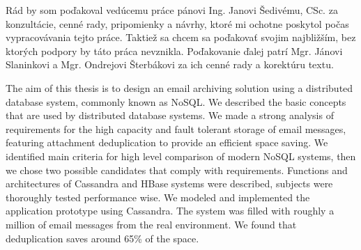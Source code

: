 \documentclass[11pt,twoside,a4paper]{book}
\begin{document}

\coverpagestarts


\acknowledgements
\noindent
Rád by som poďakoval vedúcemu práce pánovi Ing. Janovi Šedivému, CSc. za konzultácie, cenné rady, pripomienky a návrhy, ktoré mi ochotne poskytol počas vypracovávania tejto práce.
Taktiež sa chcem sa poďakovať svojim najbližším, bez ktorých podpory by táto práca nevznikla. Poďakovanie ďalej patrí Mgr. Jánovi Slaninkovi a Mgr. Ondrejovi Šterbákovi za ich cenné rady a korektúru textu.





 
\abstractpage


The aim of this thesis is to design an email archiving solution using a distributed database system, commonly known as NoSQL. We described the basic concepts that are used by distributed database systems. We made a strong analysis of requirements for the high capacity and fault tolerant storage of email messages, featuring attachment deduplication to provide an efficient space saving. We identified main criteria for high level comparison of modern NoSQL systems, then we chose two possible candidates that comply with requirements. Functions and architectures of Cassandra and HBase systems were described, subjects were thoroughly tested performance wise. We modeled and implemented the application prototype using Cassandra.
The system was filled with roughly a million of email messages from the real environment. We found that deduplication saves around 65\% of the space.
\end{document}
